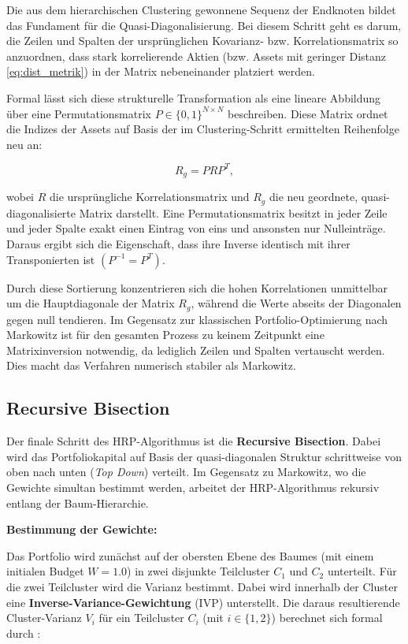 \documentclass[parskip=half]{scrartcl}
\begin{document}
	Die aus dem hierarchischen Clustering gewonnene Sequenz der Endknoten bildet das Fundament für die Quasi-Diagonalisierung. Bei diesem Schritt geht es darum, die Zeilen und Spalten der ursprünglichen Kovarianz-  bzw. Korrelationsmatrix so anzuordnen, dass stark korrelierende Aktien (bzw. Assets mit geringer Distanz \eqref{eq:dist_metrik}) in der Matrix nebeneinander platziert werden.
	
	Formal lässt sich diese strukturelle Transformation als eine lineare Abbildung über eine Permutationsmatrix $P \in \{0,1\}^{N \times N}$ beschreiben. Diese Matrix ordnet die Indizes der Assets auf Basis der im Clustering-Schritt ermittelten Reihenfolge neu an:
	
	\begin{equation}
		R_g = PRP^T \label{eq:permutation} ,
	\end{equation}
	
	wobei $R$ die ursprüngliche Korrelationsmatrix und $R_g$ die neu geordnete, quasi-diagonalisierte Matrix darstellt. Eine Permutationsmatrix besitzt in jeder Zeile und jeder Spalte exakt einen Eintrag von eins und ansonsten nur Nulleinträge. Daraus ergibt sich die Eigenschaft, dass ihre Inverse identisch mit ihrer Transponierten ist $(P^{-1} = P^T)$.
	
	Durch diese Sortierung konzentrieren sich die hohen Korrelationen unmittelbar um die Hauptdiagonale der Matrix $R_g$, während die Werte abseits der Diagonalen gegen null tendieren. Im Gegensatz zur klassischen Portfolio-Optimierung nach Markowitz ist für den gesamten Prozess zu keinem Zeitpunkt eine Matrixinversion notwendig, da lediglich Zeilen und Spalten vertauscht werden. Dies macht das Verfahren numerisch stabiler als Markowitz.
	
	
	\subsection{Recursive Bisection}
	
	Der finale Schritt des HRP-Algorithmus ist die \textbf{Recursive Bisection}. Dabei wird das Portfoliokapital auf Basis der quasi-diagonalen Struktur schrittweise von oben nach unten (\textit{Top Down}) verteilt. Im Gegensatz zu Markowitz, wo die Gewichte simultan bestimmt werden, arbeitet der HRP-Algorithmus rekursiv entlang der Baum-Hierarchie.
	
	\textbf{Bestimmung der Gewichte:}
	
	Das Portfolio wird zunächst auf der obersten Ebene des Baumes (mit einem initialen Budget $W = 1.0$) in zwei disjunkte Teilcluster $C_1$ und $C_2$ unterteilt. Für die zwei Teilcluster wird die Varianz bestimmt. Dabei wird innerhalb der Cluster eine \textbf{Inverse-Variance-Gewichtung} (IVP) unterstellt. Die daraus resultierende Cluster-Varianz $V_i$ für ein Teilcluster $C_i$ (mit $i \in \{1,2\}$) berechnet sich formal durch \parencite[8]{Lopez2}:
	
\end{document}
